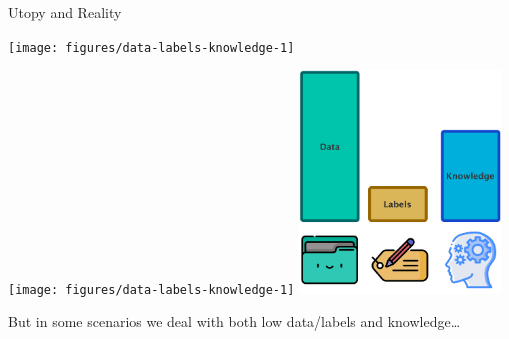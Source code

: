 \documentclass[presentation]{beamer}\mode<presentation>{\usetheme{blackAMSBolognaFC}}
\begin{document}
\begin{frame}[allowframebreaks]{Utopy and Reality}

    \hspace{0.5cm}
    \texttt{[image: figures/data-labels-knowledge-1]}
    \hfill

    \framebreak

    \hspace{0.5cm}
    {\texttt{[image: figures/data-labels-knowledge-1]}}
    \hfill
    \includegraphics[width=0.4\textwidth]{figures/data-labels-knowledge-2}
    \hspace{0.5cm}

    \framebreak

    \centering
    But in some scenarios we deal with both low data/labels and knowledge\dots

\end{frame}
\end{document}
